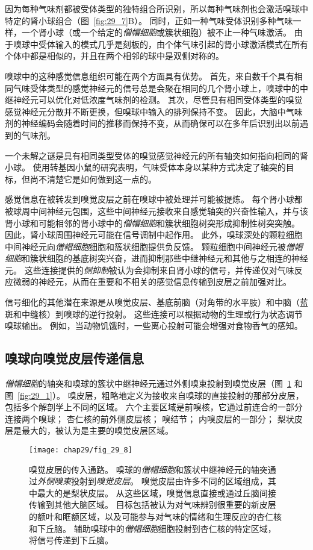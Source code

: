 因为每种气味剂都被受体类型的独特组合所识别，所以每种气味剂也会激活嗅球中特定的肾小球组合（图~\ref{fig:29_7}B）。
同时，正如一种气味受体识别多种气味一样，一个肾小球（或一个给定的\textit{僧帽细胞}或簇状细胞）被不止一种气味激活。
由于嗅球中受体输入的模式几乎是刻板的，由个体气味引起的肾小球激活模式在所有个体中都是相似的，并且在两个相邻的球中是双侧对称的。


嗅球中的这种感觉信息组织可能在两个方面具有优势。
首先，来自数千个具有相同气味受体类型的感觉神经元的信号总是会聚在相同的几个肾小球上，嗅球中的中继神经元可以优化对低浓度气味剂的检测。
其次，尽管具有相同受体类型的嗅觉感觉神经元分散并不断更换，但嗅球中输入的排列保持不变。
因此，大脑中气味剂的神经编码会随着时间的推移而保持不变，从而确保可以在多年后识别出以前遇到的气味剂。


一个未解之谜是具有相同类型受体的嗅觉感觉神经元的所有轴突如何指向相同的肾小球。
使用转基因小鼠的研究表明，气味受体本身以某种方式决定了轴突的目标，但尚不清楚它是如何做到这一点的。


感觉信息在被转发到嗅觉皮层之前在嗅球中被处理并可能被提炼。
每个肾小球都被球周中间神经元包围，这些中间神经元接收来自感觉轴突的兴奋性输入，并与该肾小球和可能相邻的肾小球中的\textit{僧帽细胞}和簇状细胞树突形成抑制性树突突触。
因此，肾小球周围神经元可能在信号调制中起作用。
此外，嗅球深处的颗粒细胞中间神经元向\textit{僧帽细胞}细胞和簇状细胞提供负反馈。
颗粒细胞中间神经元被\textit{僧帽细胞}和簇状细胞的基底树突兴奋，进而抑制那些中继神经元和其他与之相连的神经元。 
这些连接提供的\textit{侧抑制}被认为会抑制来自肾小球的信号，并传递仅对气味反应微弱的神经元，从而在重要和不相关的感觉信息传输到皮层之前加强对比。


信号细化的其他潜在来源是从嗅觉皮层、基底前脑（对角带的水平肢）和中脑（蓝斑和中缝核）到嗅球的逆行投射。
这些连接可以根据动物的生理或行为状态调节嗅球输出。 
例如，当动物饥饿时，一些离心投射可能会增强对食物香气的感知。


\subsection{嗅球向嗅觉皮层传递信息}

\textit{僧帽细胞}的轴突和嗅球的簇状中继神经元通过外侧嗅束投射到嗅觉皮层（图~\ref{fig:29_8} 和图~\ref{fig:29_1}）。
嗅皮层，粗略地定义为接收来自嗅球的直接投射的那部分皮层，包括多个解剖学上不同的区域。
六个主要区域是前嗅核，它通过前连合的一部分连接两个嗅球；
杏仁核的前外侧皮层核；
嗅结节； 内嗅皮层的一部分；
梨状皮层是最大的，被认为是主要的嗅觉皮层区域。


\begin{figure}[htbp]
	\centering
	\texttt{[image: chap29/fig\_29\_8]}
	\caption{嗅觉皮层的传入通路。
		嗅球的\textit{僧帽细胞}和簇状中继神经元的轴突通过\textit{外侧嗅束}投射到\textit{嗅觉皮层}。
		嗅觉皮层由许多不同的区域组成，其中最大的是梨状皮层。
		从这些区域，嗅觉信息直接或通过丘脑间接传输到其他大脑区域。
		目标包括被认为对气味辨别很重要的新皮层的额叶和眶额区域，以及可能参与对气味的情绪和生理反应的杏仁核和下丘脑。
		辅助嗅球中的\textit{僧帽细胞}细胞投射到杏仁核的特定区域，将信号传递到下丘脑。}
	\label{fig:29_8}
\end{figure}


